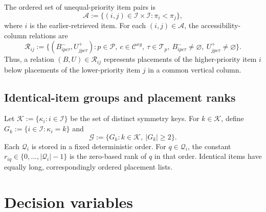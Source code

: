 \documentclass[11pt]{article}
\newcommand{\Item}{\mathcal{I}}
\newcommand{\Pallet}{\mathcal{P}}
\newcommand{\Place}{\mathcal{Q}}
\newcommand{\Cell}{\mathcal{C}}
\newcommand{\Prio}{\pi}
\begin{document}
The ordered set of unequal-priority item pairs is
\begin{equation}
  \mathcal A:=\{(i,j)\in\Item\times\Item:\Prio_i<\Prio_j\},
  \label{eq:priority-pair-set}
\end{equation}
where $i$ is the earlier-retrieved item.  For each $(i,j)\in\mathcal A$, the
accessibility-column relations are
\begin{equation}
  \mathcal R_{ij}:=\{(B^-_{i p c\tau},U^+_{j p c\tau}):p\in\Pallet,
  \ c\in\Cell^{xy},\ \tau\in\mathcal T_p,\ B^-_{i p c\tau}\ne\varnothing,
  \ U^+_{j p c\tau}\ne\varnothing\}.
  \label{eq:access-relation-set}
\end{equation}
Thus, a relation $(B,U)\in\mathcal R_{ij}$ represents placements of the
higher-priority item $i$ below placements of the lower-priority item $j$ in a
common vertical column.

\subsection{Identical-item groups and placement ranks}

Let $\mathcal K:=\{\kappa_i:i\in\Item\}$ be the set of distinct symmetry keys.
For $k\in\mathcal K$, define $G_k:=\{i\in\Item:\kappa_i=k\}$ and
\begin{equation}
  \mathcal G:=\{G_k:k\in\mathcal K,\ |G_k|\ge2\}.
  \label{eq:identical-groups}
\end{equation}
Each $\Place_i$ is stored in a fixed deterministic order.  For
$q\in\Place_i$, the constant $r_{iq}\in\{0,\ldots,|\Place_i|-1\}$ is the
zero-based rank of $q$ in that order.  Identical items have equally long,
correspondingly ordered placement lists.

\section{Decision variables}
\end{document}
